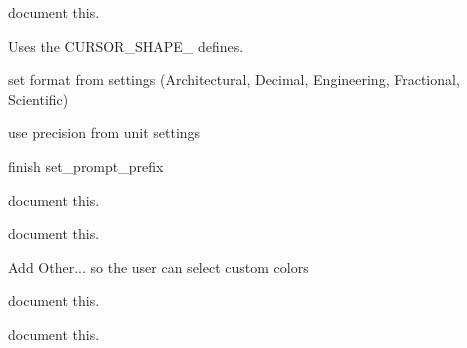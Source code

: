 \begin{DoxyRefList}
%
document this.  
\item[Member \mbox{\hyperlink{imgui__main_8c_af75ec322a64e73ba58e5f3e01f7b9aa2}{set\+\_\+cursor\+\_\+shape\+\_\+action}} (int shape)]\label{todo__todo000153}%
%
Uses the CURSOR\+\_\+\+SHAPE\+\_\+ defines.  
\item[Member \mbox{\hyperlink{imgui__main_8c_ac8010fff46f518586076f69097039e7f}{set\+\_\+mouse\+\_\+coord}} (Emb\+Vector pos)]\label{todo__todo000025}%
%
set format from settings (Architectural, Decimal, Engineering, Fractional, Scientific)

\label{todo__todo000026}%
%
use precision from unit settings  
\item[Member \mbox{\hyperlink{imgui__main_8c_a248c92649b8331edf74d484b8d0f61d9}{set\+\_\+prompt\+\_\+prefix}} (const char $\ast$msg)]\label{todo__todo000021}%
%
finish set\+\_\+prompt\+\_\+prefix  
\item[Member \mbox{\hyperlink{imgui__main_8c_af105549891b13f4a961453c220130b12}{set\+Corner\+Button}} (void)]\label{todo__todo000047}%
%
document this.  
\item[Member \mbox{\hyperlink{imgui__main_8c_ad6e751c020a31bf521b787442ca924ba}{settings\+\_\+dialog\+\_\+accept\+Changes}} (void)]\label{todo__todo000097}%
%
document this.  
\item[Member \mbox{\hyperlink{imgui__main_8c_a40c9229e61f2999bf0c1c4d2c5bd4c5d}{settings\+\_\+dialog\+\_\+add\+Colors\+To\+Combo\+Box}} (int $\ast$combo\+Box)]\label{todo__todo000087}%
%
Add Other... so the user can select custom colors  
\item[Member \mbox{\hyperlink{imgui__main_8c_a35126f9bcc3a2bdfd7205d43aebc89aa}{settings\+\_\+dialog\+\_\+button\+Custom\+Filter\+Clear\+All\+Clicked}} (void)]\label{todo__todo000090}%
%
document this.  
\item[Member \mbox{\hyperlink{imgui__main_8c_a2690fae0c60c19b2b255bf22ca1eff86}{settings\+\_\+dialog\+\_\+button\+Custom\+Filter\+Select\+All\+Clicked}} (void)]\label{todo__todo000089}%
%
document this.  
\item[Member \mbox{\hyperlink{imgui__main_8c_af05571ed1edd88a9bea59d93f573a02c}{settings\+\_\+dialog\+\_\+button\+QSnap\+Select\+All\+Clicked}} (void)]\label{todo__todo000093}%
%

\end{DoxyRefList}
